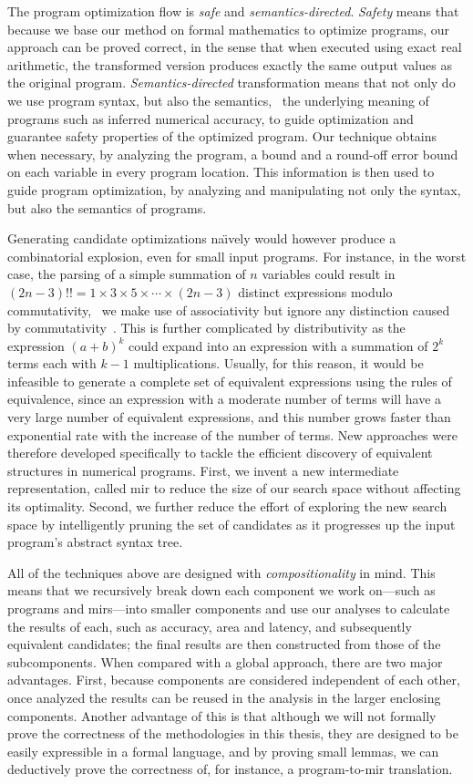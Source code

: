 The program optimization flow is \emph{safe} and \emph{semantics-directed}.
\emph{Safety} means that because we base our method on formal mathematics to
optimize programs, our approach can be proved correct, in the sense that when
executed using exact real arithmetic, the transformed version produces exactly
the same output values as the original program. \emph{Semantics-directed}
transformation means that not only do we use program syntax, but also the
semantics, \ie~the underlying meaning of programs such as inferred numerical
accuracy, to guide optimization and guarantee safety properties of the
optimized program.  Our technique obtains when necessary, by analyzing the
program, a bound and a round-off error bound on each variable in every program
location.  This information is then used to guide program optimization, by
analyzing and manipulating not only the syntax, but also the semantics of
programs.

Generating candidate optimizations na{\"\i}vely would however produce a
combinatorial explosion, even for small input programs.  For instance, in the
worst case, the parsing of a simple summation of $n$ variables could result
in $(2n - 3)!! = 1 \times 3 \times 5 \times \cdots \times (2n - 3)$ distinct
expressions modulo commutativity, \ie~we make use of associativity but ignore
any distinction caused by commutativity~\cite{ioualalen, mouilleron}.  This is
further complicated by distributivity as the expression ${(a + b)}^k$ could
expand into an expression with a summation of $2^k$ terms each with $k - 1$
multiplications.  Usually, for this reason, it would be infeasible to generate
a complete set of equivalent expressions using the rules of equivalence, since
an expression with a moderate number of terms will have a very large number of
equivalent expressions, and this number grows faster than exponential rate with
the increase of the number of terms.  New approaches were therefore developed
specifically to tackle the efficient discovery of equivalent structures in
numerical programs.  First, we invent a new intermediate representation,
called \gls{mir} to reduce the size of our search space without affecting its
optimality.  Second, we further reduce the effort of exploring the new search
space by intelligently pruning the set of candidates as it progresses up the
input program's abstract syntax tree.

All of the techniques above are designed with \emph{compositionality} in mind.
This means that we recursively break down each component we work on---such
as programs and \glspl{mir}---into smaller components and use our analyses
to calculate the results of each, such as accuracy, area and latency, and
subsequently equivalent candidates; the final results are then constructed from
those of the subcomponents.  When compared with a global approach, there are
two major advantages.  First, because components are considered independent
of each other, once analyzed the results can be reused in the analysis in the
larger enclosing components.  Another advantage of this is that although we
will not formally prove the correctness of the methodologies in this thesis,
they are designed to be easily expressible in a formal language, and by proving
small lemmas, we can deductively prove the correctness of, for instance, a
program-to-\gls{mir} translation.
